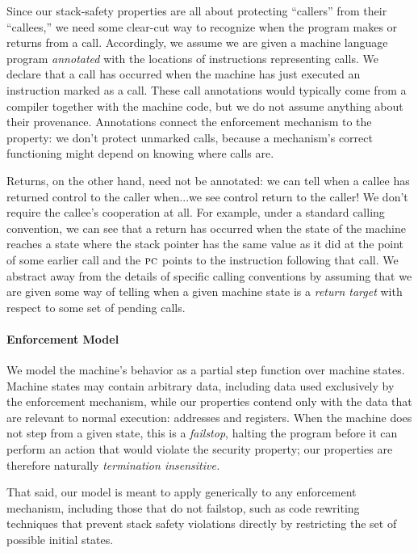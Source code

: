\documentclass[10pt,conference]{ieeetran}%
\theoremstyle{definition}
\begin{document}
Since our stack-safety properties are all about protecting ``callers'' from
their ``callees,'' we need some clear-cut way to recognize when the program
makes or returns from a call.  Accordingly, we assume we are given a machine
language program {\em annotated} with the locations of instructions
representing calls.  We declare that a call has occurred when the machine
has just executed an instruction marked as a call.
%
These call annotations would typically come from a compiler together with
the machine code, but we do not assume anything about their provenance.
Annotations connect the enforcement mechanism to the property: we don't
protect unmarked calls, because a mechanism's correct functioning might
depend on knowing where calls are.

Returns, on the other hand, need not be annotated: we can tell when a callee
has returned control to the caller when...we see control return to the
caller! We don't require the callee's cooperation at all.
For example, under a standard calling convention, we can see that a
return has occurred when the state of the machine reaches a state where
the stack pointer has the same value as it did at the point of some earlier
call and the $\textsc{pc}$ points to the instruction following that call.  We
abstract away from the details of specific calling conventions by assuming
that we are given some way of telling when a given machine state is a
{\em return target} with respect to some set of pending calls.

\paragraph*{Enforcement Model}

We model the machine's behavior as a partial step function over machine states.
Machine states may contain arbitrary data, including data used exclusively by the
enforcement mechanism, while our properties contend only with the data that are
relevant to normal execution: addresses and registers.
When the machine does not step from a given state, this
is a {\em failstop}, halting the program before it can perform an
action that would violate the security property;
our properties are therefore naturally \emph{termination insensitive.}

That said, our model is meant to apply generically to any enforcement mechanism,
including those that do not failstop, such as
code rewriting techniques that prevent stack safety violations directly by
restricting the set of possible initial states.
\end{document}
